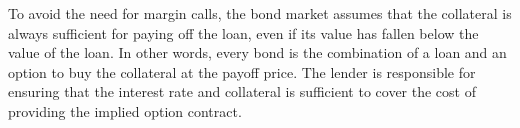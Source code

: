 To avoid the need for margin calls, the bond market assumes that the collateral
is always sufficient for paying off the loan, even if its value has fallen
below the value of the loan. In other words, every bond is the combination of
a loan and an option to buy the collateral at the payoff price. The lender is
responsible for ensuring that the interest rate and collateral is sufficient to
cover the cost of providing the implied option contract.
